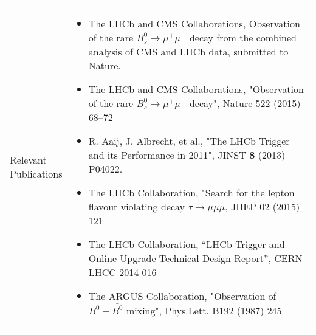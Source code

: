\begin{center}
{\begin{tabular}{@{}p{25mm}|p{190mm}@{}}
{} \tabularnewline\hline\Tstrut
\pbox{8cm}{\Tstrut Relevant\\Publications} &%
{\vspace{-3mm}
\begin{itemize}%
\item The LHCb and CMS Collaborations, Observation of the rare $B^0_s\to\mu^+\mu^-$ decay from the combined analysis of CMS and LHCb data, submitted to Nature.
\item The LHCb and CMS Collaborations, "Observation of the rare $B^0_s \rightarrow \mu^+ \mu^-$ decay", Nature 522 (2015) 68–72
\item R. Aaij, J. Albrecht, et al., "The LHCb Trigger and its Performance in 2011", JINST {\bf 8} (2013) P04022. 
\item  The LHCb Collaboration, "Search for the lepton flavour violating decay $\tau\to\mu\mu\mu$, JHEP 02 (2015) 121
\item The LHCb Collaboration, ``LHCb Trigger and Online Upgrade Technical Design Report'', CERN-LHCC-2014-016
\item The ARGUS Collaboration, "Observation of $B^0-\bar{B^0}$ mixing", Phys.Lett. B192 (1987) 245
\end{itemize}
}\tabularnewline\hline

\end{tabular}
}%
\end{center}